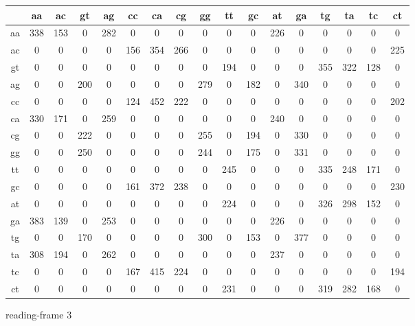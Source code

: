 \documentclass{homework}
\begin{document}
\begin{enumerate}
\begin{enumerate}
\begin{tabular}{c|cccccccccccccccc}
   & aa & ac & gt & ag & cc & ca & cg & gg & tt & gc & at & ga & tg & ta & tc & ct\\\hline
aa & 338 & 153 &   0 & 282 &   0 &   0 &   0 &   0 &   0 &   0 & 226 &   0 &   0 &   0 &   0 &   0\\
ac &   0 &   0 &   0 &   0 & 156 & 354 & 266 &   0 &   0 &   0 &   0 &   0 &   0 &   0 &   0 & 225\\
gt &   0 &   0 &   0 &   0 &   0 &   0 &   0 &   0 & 194 &   0 &   0 &   0 & 355 & 322 & 128 &   0\\
ag &   0 &   0 & 200 &   0 &   0 &   0 &   0 & 279 &   0 & 182 &   0 & 340 &   0 &   0 &   0 &   0\\
cc &   0 &   0 &   0 &   0 & 124 & 452 & 222 &   0 &   0 &   0 &   0 &   0 &   0 &   0 &   0 & 202\\
ca & 330 & 171 &   0 & 259 &   0 &   0 &   0 &   0 &   0 &   0 & 240 &   0 &   0 &   0 &   0 &   0\\
cg &   0 &   0 & 222 &   0 &   0 &   0 &   0 & 255 &   0 & 194 &   0 & 330 &   0 &   0 &   0 &   0\\
gg &   0 &   0 & 250 &   0 &   0 &   0 &   0 & 244 &   0 & 175 &   0 & 331 &   0 &   0 &   0 &   0\\
tt &   0 &   0 &   0 &   0 &   0 &   0 &   0 &   0 & 245 &   0 &   0 &   0 & 335 & 248 & 171 &   0\\
gc &   0 &   0 &   0 &   0 & 161 & 372 & 238 &   0 &   0 &   0 &   0 &   0 &   0 &   0 &   0 & 230\\
at &   0 &   0 &   0 &   0 &   0 &   0 &   0 &   0 & 224 &   0 &   0 &   0 & 326 & 298 & 152 &   0\\
ga & 383 & 139 &   0 & 253 &   0 &   0 &   0 &   0 &   0 &   0 & 226 &   0 &   0 &   0 &   0 &   0\\
tg &   0 &   0 & 170 &   0 &   0 &   0 &   0 & 300 &   0 & 153 &   0 & 377 &   0 &   0 &   0 &   0\\
ta & 308 & 194 &   0 & 262 &   0 &   0 &   0 &   0 &   0 &   0 & 237 &   0 &   0 &   0 &   0 &   0\\
tc &   0 &   0 &   0 &   0 & 167 & 415 & 224 &   0 &   0 &   0 &   0 &   0 &   0 &   0 &   0 & 194\\
ct &   0 &   0 &   0 &   0 &   0 &   0 &   0 &   0 & 231 &   0 &   0 &   0 & 319 & 282 & 168 &   0\\
\end{tabular}

\normalsize
reading-frame 3
\tiny


\end{enumerate}
\end{enumerate}
\end{document}

